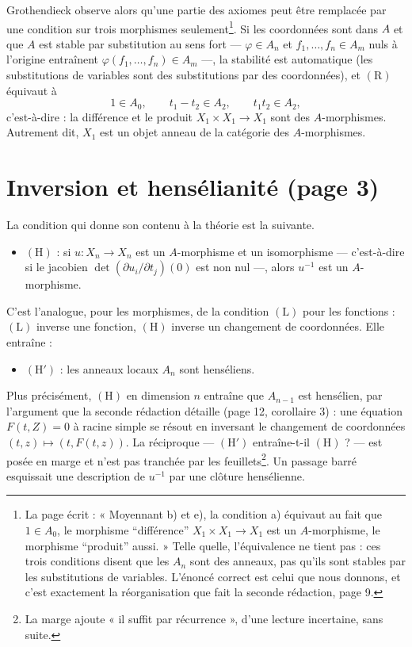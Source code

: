 \documentclass[11pt,a4paper]{article}
\begin{document}
Grothendieck observe alors qu'une partie des axiomes peut être remplacée par
une condition sur trois morphismes seulement\footnote{La page écrit :
« Moyennant b) et e), la condition a) équivaut au fait que $1 \in A_0$, le
morphisme “différence” $X_1 \times X_1 \to X_1$ est un $A$-morphisme, le
morphisme “produit” aussi. » Telle quelle, l'équivalence ne tient pas : ces
trois conditions disent que les $A_n$ sont des anneaux, pas qu'ils sont
stables par les substitutions de variables. L'énoncé correct est celui que
nous donnons, et c'est exactement la réorganisation que fait la seconde
rédaction, page 9.}. Si les coordonnées sont dans $A$ et que $A$ est stable
par substitution au sens fort — $\varphi \in A_n$ et $f_1, \ldots, f_n \in A_m$
nuls à l'origine entraînent $\varphi(f_1, \ldots, f_n) \in A_m$ —, la stabilité
est automatique (les substitutions de variables sont des substitutions par
des coordonnées), et $(\mathrm{R})$ équivaut à
\[
  1 \in A_0, \qquad t_1 - t_2 \in A_2, \qquad t_1 t_2 \in A_2,
\]
c'est-à-dire : la différence et le produit $X_1 \times X_1 \to X_1$ sont des
$A$-morphismes. Autrement dit, $X_1$ est un objet anneau de la catégorie des
$A$-morphismes.

\section*{Inversion et hensélianité (page 3)}

La condition qui donne son contenu à la théorie est la suivante.

\begin{itemize}
  \item $(\mathrm{H})$ : si $u : X_n \to X_n$ est un $A$-morphisme et un
    isomorphisme — c'est-à-dire si le jacobien $\det(\partial u_i/\partial t_j)(0)$
    est non nul —, alors $u^{-1}$ est un $A$-morphisme.
\end{itemize}

C'est l'analogue, pour les morphismes, de la condition $(\mathrm{L})$ pour les
fonctions : $(\mathrm{L})$ inverse une fonction, $(\mathrm{H})$ inverse un
changement de coordonnées. Elle entraîne :

\begin{itemize}
  \item $(\mathrm{H}')$ : les anneaux locaux $A_n$ sont henséliens.
\end{itemize}

Plus précisément, $(\mathrm{H})$ en dimension $n$ entraîne que $A_{n-1}$ est
hensélien, par l'argument que la seconde rédaction détaille (page 12,
corollaire 3) : une équation $F(t, Z) = 0$ à racine simple se résout en
inversant le changement de coordonnées $(t, z) \mapsto (t, F(t, z))$. La
réciproque — $(\mathrm{H}')$ entraîne-t-il $(\mathrm{H})$ ? — est posée en marge
et n'est pas tranchée par les feuillets\footnote{La marge ajoute « il suffit
par récurrence », d'une lecture incertaine, sans suite.}. Un passage barré
esquissait une description de $u^{-1}$ par une clôture hensélienne.
\end{document}
